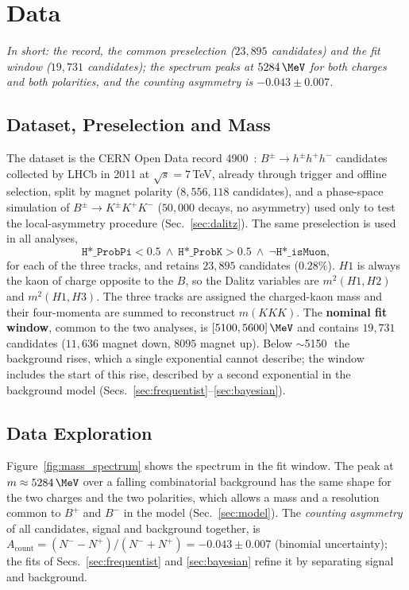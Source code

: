 \section{Data}
\label{sec:data}
\emph{In short: the record, the common preselection ($23{,}895$ candidates) and the fit window ($19{,}731$ candidates); the spectrum peaks at $5284\,\MeV$ for both charges and both polarities, and the counting asymmetry is $-0.043\pm0.007$.}
\subsection{Dataset, Preselection and Mass}
\label{sec:data_presel}
The dataset is the CERN Open Data record 4900~\cite{opendata_record}: $B^{\pm}\to h^{\pm}h^{+}h^{-}$ candidates collected by LHCb in 2011 at $\sqrt{s}=7$\,TeV, already through trigger and offline selection, split by magnet polarity ($8{,}556{,}118$ candidates), and a phase-space simulation of $B^{\pm}\to K^{\pm}K^{+}K^{-}$ ($50{,}000$ decays, no asymmetry) used only to test the local-asymmetry procedure (Sec.~\ref{sec:dalitz}). The same preselection is used in all analyses,
\[
\texttt{H*\_ProbPi} < 0.5 \ \wedge\ \texttt{H*\_ProbK} > 0.5 \ \wedge\ \lnot\texttt{H*\_isMuon},
\]
for each of the three tracks, and retains $23{,}895$ candidates ($0.28\%$). $H1$ is always the kaon of charge opposite to the $B$, so the Dalitz variables are $m^2(H1,H2)$ and $m^2(H1,H3)$.
\label{sec:data_mass}
The three tracks are assigned the charged-kaon mass and their four-momenta are summed to reconstruct $m(KKK)$. The \textbf{nominal fit window}, common to the two analyses, is $[5100,5600]\,\MeV$ and contains $19{,}731$ candidates ($11{,}636$ magnet down, $8095$ magnet up). Below $\sim$5150\,\MeV\ the background rises, which a single exponential cannot describe; the window includes the start of this rise, described by a second exponential in the background model (Secs.~\ref{sec:frequentist}--\ref{sec:bayesian}).
\subsection{Data Exploration}
\label{sec:data_exploration}

Figure~\ref{fig:mass_spectrum} shows the spectrum in the fit window. The peak at $m\approx5284\,\MeV$ over a falling combinatorial background has the same shape for the two charges and the two polarities, which allows a mass and a resolution common to $B^+$ and $B^-$ in the model (Sec.~\ref{sec:model}). The \emph{counting asymmetry} of all candidates, signal and background together, is $A_{\mathrm{count}}=(N^--N^+)/(N^-+N^+)=-0.043\pm0.007$ (binomial uncertainty); the fits of Secs.~\ref{sec:frequentist} and \ref{sec:bayesian} refine it by separating signal and background.


